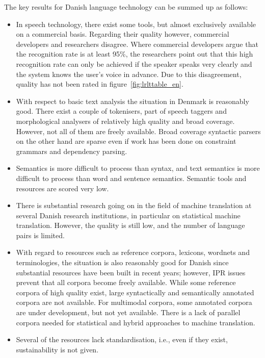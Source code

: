 \documentclass[]{../../metanetpaper}
\begin{document}
\begin{multicols}{2}
The key results for Danish language technology can be summed up as follows:

\begin{itemize}
\item In speech technology, there exist some tools, but almost exclusively available on a commercial basis. Regarding their quality however, commercial developers and researchers disagree. Where commercial developers argue that the recognition rate is at least 95\%, the researchers point out that this high recognition rate can only be achieved if the speaker speaks very clearly and the system knows the user's voice in advance. Due to this disagreement, quality has not been rated in figure~\ref{fig:lrlttable_en}.
\item With respect to basic text analysis the situation in Denmark is reasonably good. There exist a couple of tokenisers, part of speech taggers and morphological analysers of relatively high quality and broad coverage.  However, not all of them are freely available. Broad coverage syntactic parsers on the other hand are sparse even if work has been done on constraint grammars and dependency parsing.
\item Semantics is more difficult to process than syntax, and text semantics is more difficult to process than word and sentence semantics. Semantic tools and resources are scored very low. 
\item There is substantial research going on in the field of machine translation at several Danish research institutions, in particular on statistical machine translation. However, the quality is still low, and the number of language pairs is limited.
\item With regard to resources such as reference corpora, lexicons, wordnets and terminologies, the situation is also reasonably good for Danish since substantial resources have been built in recent years; however, IPR issues prevent that all corpora become freely available. While some reference corpora of high quality exist, large syntactically and semantically annotated corpora are not available. For multimodal corpora, some annotated corpora are under development, but not yet available. There is a lack of parallel corpora needed for statistical and hybrid approaches to machine translation.
\item Several of the resources lack standardisation, i.e., even if they exist, sustainability is not given.
\end{itemize}


\end{multicols}
\end{document}
